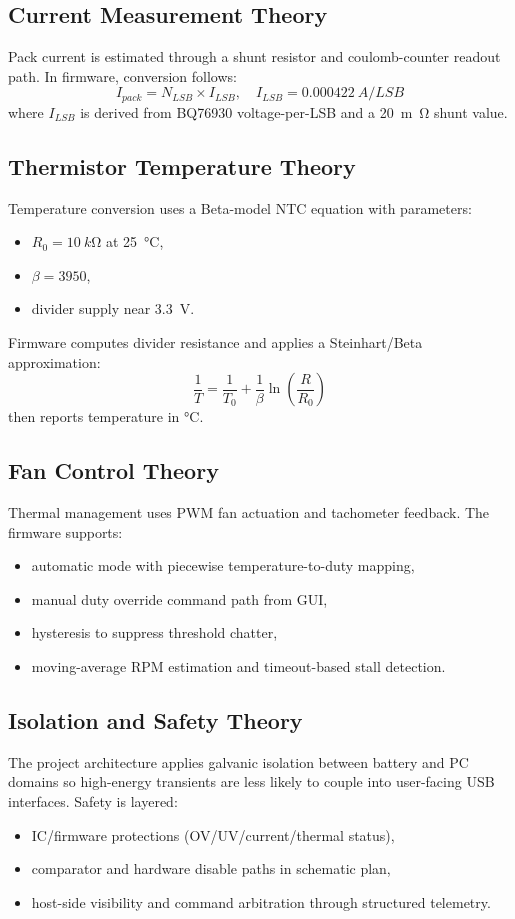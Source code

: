 \documentclass[12pt]{article}
\begin{document}
\subsection{Current Measurement Theory}
Pack current is estimated through a shunt resistor and coulomb-counter readout path. In firmware, conversion follows:
\[
I_{pack} = N_{LSB}\times I_{LSB},\quad I_{LSB}=\SI{0.000422}{A/LSB}
\]
where \(I_{LSB}\) is derived from BQ76930 voltage-per-LSB and a \SI{20}{m\ohm} shunt value.

\subsection{Thermistor Temperature Theory}
Temperature conversion uses a Beta-model NTC equation with parameters:
\begin{itemize}[leftmargin=1.2cm]
    \item \(R_0 = \SI{10}{k\ohm}\) at \SI{25}{\celsius},
    \item \(\beta = 3950\),
    \item divider supply near \SI{3.3}{V}.
\end{itemize}
Firmware computes divider resistance and applies a Steinhart/Beta approximation:
\[
\frac{1}{T}=\frac{1}{T_0}+\frac{1}{\beta}\ln\left(\frac{R}{R_0}\right)
\]
then reports temperature in \si{\celsius}.

\subsection{Fan Control Theory}
Thermal management uses PWM fan actuation and tachometer feedback. The firmware supports:
\begin{itemize}[leftmargin=1.2cm]
    \item automatic mode with piecewise temperature-to-duty mapping,
    \item manual duty override command path from GUI,
    \item hysteresis to suppress threshold chatter,
    \item moving-average RPM estimation and timeout-based stall detection.
\end{itemize}

\subsection{Isolation and Safety Theory}
The project architecture applies galvanic isolation between battery and PC domains so high-energy transients are less likely to couple into user-facing USB interfaces. Safety is layered:
\begin{itemize}[leftmargin=1.2cm]
    \item IC/firmware protections (OV/UV/current/thermal status),
    \item comparator and hardware disable paths in schematic plan,
    \item host-side visibility and command arbitration through structured telemetry.
\end{itemize}
\end{document}
